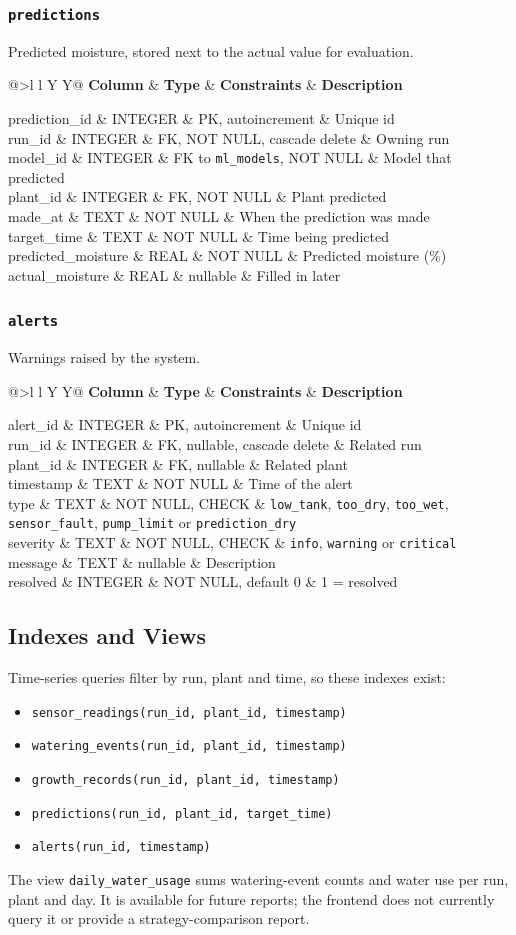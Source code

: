 \documentclass[11pt,a4paper]{article}
\makeatletter
\newcommand{\cn}[1]{\texttt{#1}}   %
\newcommand{\dbtable}[3]{%
  \Needspace{10\baselineskip}%
  \subsubsection*{\texttt{#1}}%
  #2\par\smallskip
  {\small
  \begin{tabularx}{\textwidth}{@{}>{\ttfamily}l l Y Y@{}}
    \toprule
    \textbf{Column} & \textbf{Type} & \textbf{Constraints} & \textbf{Description}\\
    \midrule
    #3
    \bottomrule
  \end{tabularx}}\par\bigskip}
\makeatother
\begin{document}
\dbtable{predictions}{Predicted moisture, stored next to the actual value for evaluation.}{
  prediction\_id & INTEGER & PK, autoincrement & Unique id\\
  run\_id & INTEGER & FK, NOT NULL, cascade delete & Owning run\\
  model\_id & INTEGER & FK to \cn{ml\_models}, NOT NULL & Model that predicted\\
  plant\_id & INTEGER & FK, NOT NULL & Plant predicted\\
  made\_at & TEXT & NOT NULL & When the prediction was made\\
  target\_time & TEXT & NOT NULL & Time being predicted\\
  predicted\_moisture & REAL & NOT NULL & Predicted moisture (\%)\\
  actual\_moisture & REAL & nullable & Filled in later\\
}

\dbtable{alerts}{Warnings raised by the system.}{
  alert\_id & INTEGER & PK, autoincrement & Unique id\\
  run\_id & INTEGER & FK, nullable, cascade delete & Related run\\
  plant\_id & INTEGER & FK, nullable & Related plant\\
  timestamp & TEXT & NOT NULL & Time of the alert\\
  type & TEXT & NOT NULL, CHECK & \cn{low\_tank}, \cn{too\_dry}, \cn{too\_wet}, \cn{sensor\_fault}, \cn{pump\_limit} or \cn{prediction\_dry}\\
  severity & TEXT & NOT NULL, CHECK & \cn{info}, \cn{warning} or \cn{critical}\\
  message & TEXT & nullable & Description\\
  resolved & INTEGER & NOT NULL, default 0 & 1 = resolved\\
}

\subsection{Indexes and Views}
Time-series queries filter by run, plant and time, so these indexes exist:
\begin{itemize}
  \item \cn{sensor\_readings(run\_id, plant\_id, timestamp)}
  \item \cn{watering\_events(run\_id, plant\_id, timestamp)}
  \item \cn{growth\_records(run\_id, plant\_id, timestamp)}
  \item \cn{predictions(run\_id, plant\_id, target\_time)}
  \item \cn{alerts(run\_id, timestamp)}
\end{itemize}
The view \cn{daily\_water\_usage} sums watering-event counts and water use per
run, plant and day. It is available for future reports; the frontend does not
currently query it or provide a strategy-comparison report.
\end{document}
